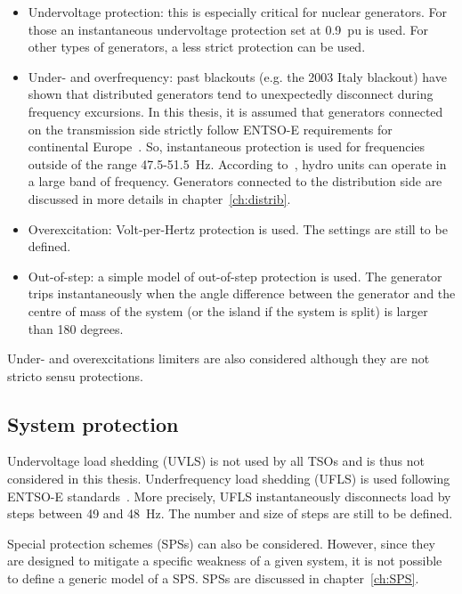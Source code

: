 \begin{itemize}
    \item Undervoltage protection: this is especially critical for nuclear generators. For those an instantaneous undervoltage protection set at 0.9~pu is used. For other types of generators, a less strict protection can be used. 
    \item Under- and overfrequency: past blackouts (e.g. the 2003 Italy blackout) have shown that distributed generators tend to unexpectedly disconnect during frequency excursions. In this thesis, it is assumed that generators connected on the transmission side strictly follow ENTSO-E requirements for continental Europe~\cite{ENTSOEgeneratorRequirements}. So, instantaneous protection is used for frequencies outside of the range 47.5-51.5~Hz. According to~\cite{PSRCreportProtectionMisop}, hydro units can operate in a large band of frequency. Generators connected to the distribution side are discussed in more details in chapter~\ref{ch:distrib}.
    \item Overexcitation: Volt-per-Hertz protection is used. The settings are still to be defined.
    \item Out-of-step: a simple model of out-of-step protection is used. The generator trips instantaneously when the angle difference between the generator and the centre of mass of the system (or the island if the system is split) is larger than 180 degrees.
\end{itemize}

Under- and overexcitations limiters are also considered although they are not stricto sensu protections.


\subsection{System protection}

Undervoltage load shedding (UVLS) is not used by all TSOs and is thus not considered in this thesis. Underfrequency load shedding (UFLS) is used following ENTSO-E standards~\cite{ENTSOE-UFLS}. More precisely, UFLS instantaneously disconnects load by steps between 49 and 48~Hz. The number and size of steps are still to be defined.

Special protection schemes (SPSs) can also be considered. However, since they are designed to mitigate a specific weakness of a given system, it is not possible to define a generic model of a SPS. SPSs are discussed in chapter~\ref{ch:SPS}.

